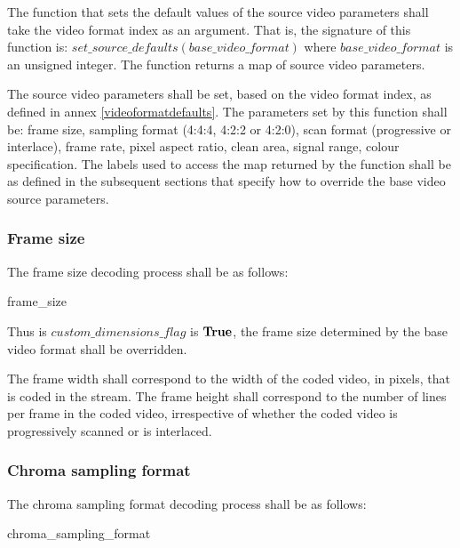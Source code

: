 The function that sets the default values of the source video parameters 
shall take the video format index as an argument. That is, the signature of this 
function is: $set\_source\_defaults(base\_video\_format)$ where 
$base\_video\_format$ is an unsigned integer. The function returns a map 
of source video parameters.

The source video parameters shall be set, based on the video format index, 
as defined in annex \ref{videoformatdefaults}. The parameters set by this 
function shall be: frame size, sampling format (4:4:4, 4:2:2 or 4:2:0), 
scan format (progressive or interlace), frame rate, pixel aspect ratio, 
clean area, signal range, colour specification. The labels used to access the 
map returned by the function shall be as defined in the
subsequent sections that specify how to override the base video source 
parameters.

\subsubsection{Frame size}
\label{framedimensions}

The frame size decoding process shall be as follows:

\begin{pseudo}{frame\_size}{\VideoParams}
\bsEND
\end{pseudo}

Thus is $custom\_dimensions\_flag$ is $\text{\bf{True}}$, the frame size determined by the
base video format shall be overridden.

The frame width shall correspond to the width of the coded video, in pixels, that
is coded in the stream. The frame height shall correspond to the number of lines
per frame in the coded video, irrespective of whether the coded video is
progressively scanned or is interlaced.

\subsubsection{Chroma sampling format}
\label{chromaformat}

The chroma sampling format decoding process shall be as follows:

\begin{pseudo}{chroma\_sampling\_format}{\VideoParams}
\bsEND
\end{pseudo}

